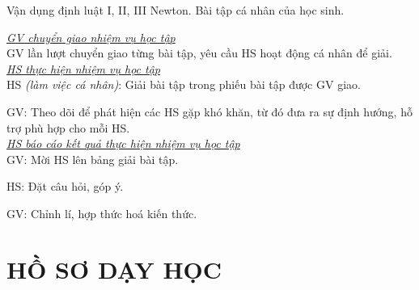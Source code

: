 {
	Vận dụng định luật I, II, III Newton.
}
{
	Bài tập cá nhân của học sinh.
}
{
	\textit{\underline{GV chuyển giao nhiệm vụ học tập}}\\
	GV lần lượt chuyển giao từng bài tập, yêu cầu HS hoạt động cá nhân để giải.\\
	\textit{\underline{HS thực hiện nhiệm vụ học tập}}\\
	HS \textit{(làm việc cá nhân)}:  Giải bài tập trong phiếu bài tập được GV giao. 
	
	GV: Theo dõi để phát hiện các HS gặp khó khăn, từ đó đưa ra sự định hướng, hỗ trợ phù hợp cho mỗi HS.\\
	\textit{\underline{HS báo cáo kết quả thực hiện nhiệm vụ học tập}}\\
	GV: Mời HS lên bảng giải bài tập.
	
	HS: Đặt câu hỏi, góp ý.
	
	GV: Chỉnh lí, hợp thức hoá kiến thức.
}
\section{HỒ SƠ DẠY HỌC}
